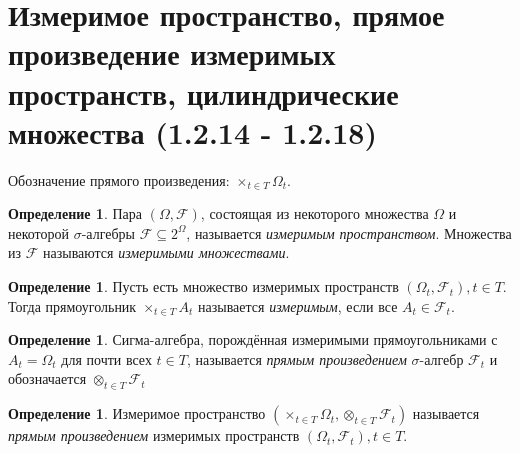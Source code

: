 \documentclass[16pt]{article}
\theoremstyle{definition}
\newtheorem{definition}[theorem]{Определение}
\begin{document}
\section{Измеримое пространство, прямое произведение измеримых пространств, цилиндрические множества (1.2.14 - 1.2.18)}
Обозначение прямого произведения: $\times_{t \in T}\Omega_t$.
\begin{definition}
Пара $(\Omega, \mathcal{F})$, состоящая из некоторого множества $\Omega$ и некоторой $\sigma$-алгебры $\mathcal{F} \subseteq 2^\Omega$, называется \textit{измеримым пространством}. Множества из $\mathcal{F}$ называются \textit{измеримыми множествами}.
\end{definition}

\begin{definition}
Пусть есть множество измеримых пространств $(\Omega_t, \mathcal{F}_t), t \in T$. Тогда прямоугольник $\times_{t \in T}A_t$ называется \textit{измеримым}, если все $A_t \in \mathcal{F}_t$.
\end{definition}

\begin{definition}
Сигма-алгебра, порождённая измеримыми прямоугольниками с $A_t = \Omega_t$ для почти всех $t \in T$, называется \textit{прямым произведением} $\sigma$-алгебр $\mathcal{F}_t$ и обозначается $\otimes_{t \in T}\mathcal{F}_t$
\end{definition}

\begin{definition}
Измеримое пространство $(\times_{t \in T}\Omega_t, \otimes_{t \in T}\mathcal{F}_t)$ называется \textit{прямым произведением} измеримых пространств $(\Omega_t, \mathcal{F}_t), t \in T$.
\end{definition}
\end{document}
